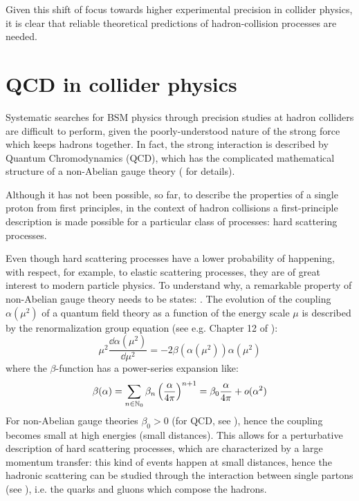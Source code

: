 Given this shift of focus towards higher experimental precision in collider physics, it is clear that reliable theoretical predictions of hadron-collision processes are needed.

\section{QCD in collider physics}

Systematic searches for BSM physics through precision studies at hadron colliders are difficult to perform, given the poorly-understood nature of the strong force which keeps hadrons together. In fact, the strong interaction is described by Quantum Chromodynamics (QCD), which has the complicated mathematical structure of a non-Abelian gauge theory ( for details).

Although it has not been possible, so far, to describe the properties of a single proton from first principles, in the context of hadron collisions a first-principle description is made possible for a particular class of processes: hard scattering processes.

Even though hard scattering processes have a lower probability of happening, with respect, for example, to elastic scattering processes, they are of great interest to modern particle physics. To understand why, a remarkable property of non-Abelian gauge theory needs to be states: . The evolution of the coupling $ \alpha(\mu^2) $ of a quantum field theory as a function of the energy scale $ \mu $ is described by the renormalization group equation (see e.g. Chapter 12 of \cite{Peskin-1995}):
\begin{equation}
  \mu^2 \frac{\dd \alpha(\mu^2)}{\dd \mu^2} = - 2 \beta(\alpha(\mu^2)) \alpha(\mu^2)
  \label{eq:ren-gr}
\end{equation}
where the $ \beta $-function has a power-series expansion like:
\begin{equation}
  \beta(\alpha) = \sum_{n \in \mathbb{N}_0} \beta_n \left( \frac{\alpha}{4\pi} \right)^{n+1} = \beta_0 \frac{\alpha}{4\pi} + o(\alpha^2)
\end{equation}
For non-Abelian gauge theories $ \beta_0 > 0 $ (for QCD, see \cite{Gross-1973, Politzer-1973}), hence the coupling becomes small at high energies (small distances). This allows for a perturbative description of hard scattering processes, which are characterized by a large momentum transfer: this kind of events happen at small distances, hence the hadronic scattering can be studied through the interaction between single partons (see ), i.e. the quarks and gluons which compose the hadrons.

